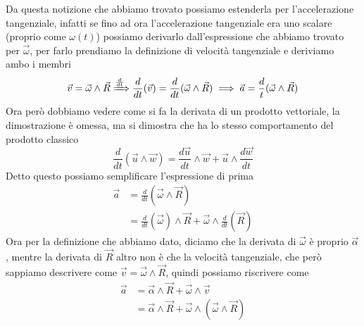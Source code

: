 \documentclass{rapport}
\begin{document}
Da questa notizione che abbiamo trovato possiamo estenderla per l'accelerazione tangenziale, infatti se fino ad ora l'accelerazione tangenziale era uno scalare (proprio come $\omega(t)$) possiamo derivarlo dall'espressione che abbiamo trovato per $\vec{\omega}$, per farlo prendiamo la definizione di velocità tangenziale e deriviamo ambo i membri
\[
\vec{v} = \vec{\omega} \wedge \vec{R} \xRightarrow{\frac{d}{dt}} \frac{d}{dt}(\vec{v}) = \frac{d}{dt}(\vec{\omega} \wedge \vec{R}) \implies \vec{a} =  \frac{d}{t}(\vec{\omega} \wedge \vec{R}) 
\]
Ora però dobbiamo vedere come si fa la derivata di un prodotto vettoriale, la dimostrazione è omessa, ma si dimostra che ha lo stesso comportamento del prodotto classico
\[
\frac{d}{dt}(\vec{u} \wedge \vec{w}) =  \frac{d\vec{u}}{dt}  \wedge \vec{w} +  \vec{u}\wedge \frac{d\vec{w}}{dt} 
\]
Detto questo possiamo semplificare l'espressione di prima 
\begin{align*}
\vec{a} &= \frac{d}{dt}(\vec{\omega} \wedge \vec{R})  \\
&= \frac{d}{dt}(\vec{\omega})  \wedge \vec{R} + \vec{\omega} \wedge\frac{d}{dt}( \vec{R}) 
\end{align*}
Ora per la definizione che abbiamo dato, diciamo che la derivata di $\vec{\omega}$ è proprio $\vec{\alpha}$, mentre la derivata di $\vec{R}$ altro non è che la velocità tangenziale, che però sappiamo descrivere come $\vec{v} = \vec{\omega} \wedge \vec{R}$, quindi possiamo riscrivere come 
\begin{align*}
\vec{a} &=  \vec{\alpha}  \wedge \vec{R} + \vec{\omega} \wedge\vec{v} \\
&= \vec{\alpha}  \wedge \vec{R} + \vec{\omega} \wedge(\vec{\omega} \wedge \vec{R}) 
\end{align*}
\end{document}
